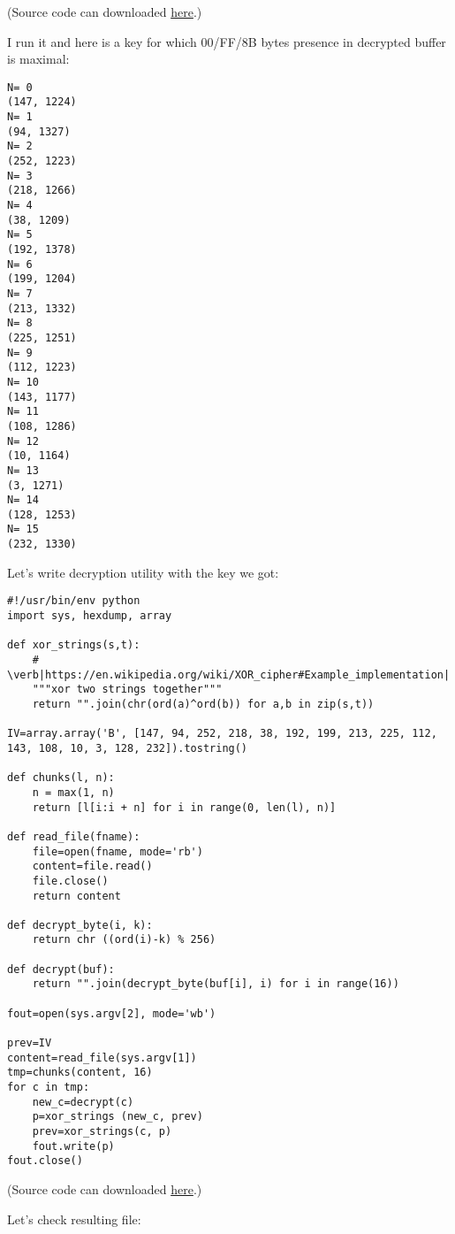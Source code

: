 (Source code can downloaded \href{https://github.com/DennisYurichev/RE-for-beginners/blob/master/examples/simple_exec_crypto/files/decrypt.py}{here}.)

I run it and here is a key for which 00/FF/8B bytes presence in decrypted buffer is maximal:

\begin{lstlisting}
N= 0
(147, 1224)
N= 1
(94, 1327)
N= 2
(252, 1223)
N= 3
(218, 1266)
N= 4
(38, 1209)
N= 5
(192, 1378)
N= 6
(199, 1204)
N= 7
(213, 1332)
N= 8
(225, 1251)
N= 9
(112, 1223)
N= 10
(143, 1177)
N= 11
(108, 1286)
N= 12
(10, 1164)
N= 13
(3, 1271)
N= 14
(128, 1253)
N= 15
(232, 1330)
\end{lstlisting}

Let's write decryption utility with the key we got:

\begin{lstlisting}[style=custompy]
#!/usr/bin/env python
import sys, hexdump, array

def xor_strings(s,t):
    # \verb|https://en.wikipedia.org/wiki/XOR_cipher#Example_implementation|
    """xor two strings together"""
    return "".join(chr(ord(a)^ord(b)) for a,b in zip(s,t))

IV=array.array('B', [147, 94, 252, 218, 38, 192, 199, 213, 225, 112, 143, 108, 10, 3, 128, 232]).tostring()

def chunks(l, n):
    n = max(1, n)
    return [l[i:i + n] for i in range(0, len(l), n)]

def read_file(fname):
    file=open(fname, mode='rb')
    content=file.read()
    file.close()
    return content

def decrypt_byte(i, k):
    return chr ((ord(i)-k) % 256)

def decrypt(buf):
    return "".join(decrypt_byte(buf[i], i) for i in range(16))

fout=open(sys.argv[2], mode='wb')

prev=IV
content=read_file(sys.argv[1])
tmp=chunks(content, 16)
for c in tmp:
    new_c=decrypt(c)
    p=xor_strings (new_c, prev)
    prev=xor_strings(c, p)
    fout.write(p)
fout.close()
\end{lstlisting}

(Source code can downloaded \href{https://github.com/DennisYurichev/RE-for-beginners/blob/master/examples/simple_exec_crypto/files/decrypt2.py}{here}.)

Let's check resulting file:



